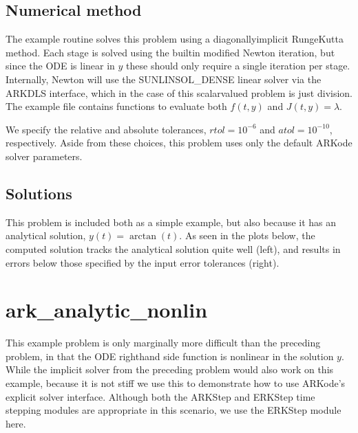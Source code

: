 \documentclass[letterpaper,10pt,english]{sphinxmanual}
\begin{document}
\subsection{Numerical method}
\label{\detokenize{c_serial:numerical-method}}
\sphinxAtStartPar
The example routine solves this problem using a diagonally\sphinxhyphen{}implicit
Runge\sphinxhyphen{}Kutta method.  Each stage is solved using the built\sphinxhyphen{}in modified
Newton iteration, but since the ODE is linear in \(y\) these
should only require a single iteration per stage.  Internally, Newton
will use the SUNLINSOL\_DENSE linear solver via the ARKDLS interface,
which in the case of this scalar\sphinxhyphen{}valued problem is just division.  The
example file contains functions to evaluate both \(f(t,y)\) and
\(J(t,y)=\lambda\).

\sphinxAtStartPar
We specify the relative and absolute tolerances, \(rtol=10^{-6}\)
and \(atol=10^{-10}\), respectively.  Aside from these choices,
this problem uses only the default ARKode solver parameters.


\subsection{Solutions}
\label{\detokenize{c_serial:solutions}}
\sphinxAtStartPar
This problem is included both as a simple example, but also because it
has an analytical solution, \(y(t) = \arctan(t)\).  As seen in the
plots below, the computed solution tracks the analytical solution
quite well (left), and results in errors below those specified by the input
error tolerances (right).

\noindent{}

\noindent{}


\section{ark\_analytic\_nonlin}
\label{\detokenize{c_serial:ark-analytic-nonlin}}\label{\detokenize{c_serial:id2}}
\sphinxAtStartPar
This example problem is only marginally more difficult than the
preceding problem, in that the ODE right\sphinxhyphen{}hand side function is
nonlinear in the solution \(y\).  While the implicit solver from
the preceding problem would also work on this example, because it is
not stiff we use this to demonstrate how to use ARKode’s explicit
solver interface.  Although both the ARKStep and ERKStep time stepping
modules are appropriate in this scenario, we use the ERKStep module
here.
\end{document}
